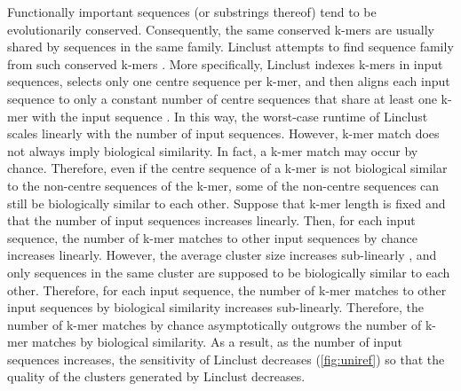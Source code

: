 \documentclass[11pt,letterpaper]{llncs2e/llncs}
\begin{document}
Functionally important sequences (or substrings thereof) tend to be evolutionarily conserved.
Consequently, the same conserved k-mers are usually shared by sequences in the same family.
Linclust attempts to find sequence family from such conserved k-mers \citep{steinegger2017linclust}.
More specifically, 
	Linclust indexes k-mers in input sequences, 
	selects only one centre sequence per k-mer,
	and then aligns each input sequence to only a constant number of centre sequences that share at least one k-mer with the input sequence \citep{steinegger2017linclust}.
In this way, the worst-case runtime of Linclust scales linearly with the number of input sequences.
However, k-mer match does not always imply biological similarity.
In fact, a k-mer match may occur by chance.
Therefore,
	even if the centre sequence of a k-mer is not biological similar to the non-centre sequences of the k-mer, 
	some of the non-centre sequences can still be biologically similar to each other.
Suppose that k-mer length is fixed and that the number of input sequences increases linearly.
Then, for each input sequence,
	the number of k-mer matches to other input sequences by chance increases linearly.
However,
	the average cluster size increases sub-linearly \citep[Fig. 3]{suzek2014uniref},
	and only sequences in the same cluster are supposed to be biologically similar to each other.
Therefore,
	for each input sequence,
	the number of k-mer matches to other input sequences by biological similarity increases sub-linearly.
Therefore, the number of k-mer matches by chance asymptotically outgrows the number of k-mer matches by biological similarity.
As a result, as the number of input sequences increases, 
	the sensitivity of Linclust decreases (\cref{fig:uniref}) so that the quality of the clusters generated by Linclust decreases.


\end{document}
